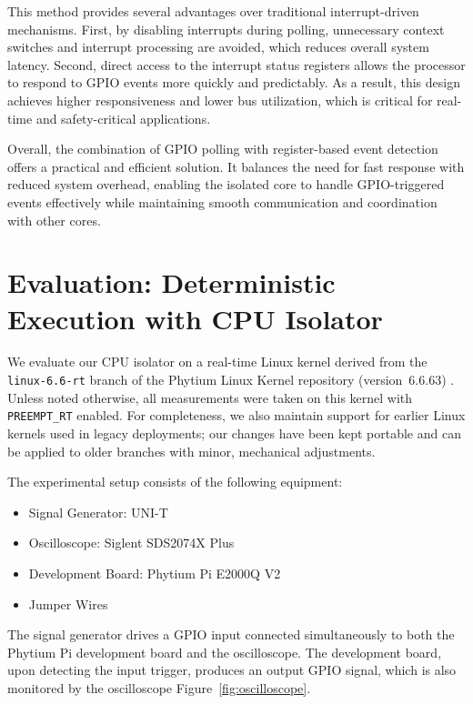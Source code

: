 \documentclass[letterpaper]{article}
\begin{document}
This method provides several advantages over traditional interrupt-driven mechanisms. First,
by disabling interrupts during polling, unnecessary context switches and interrupt processing
are avoided, which reduces overall system latency. Second, direct access to the interrupt status
registers allows the processor to respond to GPIO events more quickly and predictably. As a result,
this design achieves higher responsiveness and lower bus utilization, which is critical for
real-time and safety-critical applications.

Overall, the combination of GPIO polling with register-based event detection offers a practical
and efficient solution. It balances the need for fast response with reduced system overhead,
enabling the isolated core to handle GPIO-triggered events effectively while maintaining smooth
communication and coordination with other cores.


\section{Evaluation: Deterministic Execution with CPU Isolator}


\label{sec:eval-iso}
We evaluate our CPU isolator on a real-time Linux kernel derived from the
\texttt{linux-6.6-rt} branch of the Phytium Linux Kernel repository
(version~6.6.63) \cite{phytium-linux-6.6-rt}. Unless noted otherwise,
all measurements were taken on this kernel with \texttt{PREEMPT\_RT} enabled.
For completeness, we also maintain support for earlier Linux kernels used in
legacy deployments; our changes have been kept portable and can be applied to
older branches with minor, mechanical adjustments.


The experimental setup consists of the following equipment:  
\begin{itemize}
  \item Signal Generator: UNI-T  
  \item Oscilloscope: Siglent SDS2074X Plus  
  \item Development Board: Phytium Pi E2000Q V2  
  \item Jumper Wires  
\end{itemize}

The signal generator drives a GPIO input connected simultaneously to both the Phytium Pi development board and the oscilloscope. The development board, upon detecting the input trigger, produces an output GPIO signal, which is also monitored by the oscilloscope Figure~\ref{fig:oscilloscope}.  
\end{document}
